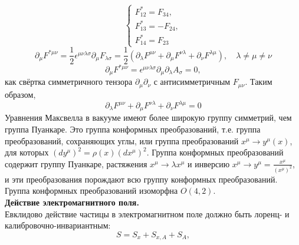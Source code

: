 \documentclass[12pt]{article}
\theoremstyle{definition}
\begin{document}
\begin{equation}
    \begin{cases}
        F^*_{12}=F_{34},\\
        F^*_{13}=-F_{24},\\
        F^*_{14}=F_{23}
    \end{cases}
\end{equation}
\begin{equation}
    \partial_\mu F^{*\mu\nu}=\frac{1}{2}\epsilon^{\mu\nu\lambda\sigma}\partial_\mu F_{\lambda\sigma}=\frac{1}{2}(\partial_\lambda F^{\mu\nu}+\partial_\mu F^{\nu\lambda}+\partial_\nu F^{\lambda\mu}),\quad\lambda\neq\mu\neq\nu
\end{equation}
\begin{equation}
    \partial_\mu F^{*\mu\nu}=\epsilon^{\mu\nu\lambda\sigma}\partial_\mu\partial_\lambda A_\sigma=0,
\end{equation}
как свёртка симметричного тензора $\partial_\mu\partial_\nu$ с антисимметричным $F_{\mu\nu}$. Таким образом,
\begin{equation}
    \partial_\lambda F^{\mu\nu}+\partial_\mu F^{\nu\lambda}+\partial_\nu F^{\lambda\mu}=0
\end{equation}
Уравнения Максвелла в вакууме имеют более широкую группу симметрий, чем группа Пуанкаре. Это группа конформных преобразований, т.е. группа преобразований, сохраняющих углы, или группа преобразований $x^\mu\rightarrow y^\mu(x)$, для которых $(dy^\mu)^2 = \rho(x)(dx^\mu)^2$. Группа конформных преобразований содержит группу Пуанкаре, растяжения $x^\mu\rightarrow\lambda x^\mu$ и инверсию $x^\mu \rightarrow y^\mu =\frac{x^\mu}{(x^\mu)^2}$, и эти преобразования порождают всю группу конформных преобразований. Группа конформных преобразований изоморфна $O(4,2)$.\\
\textbf{Действие электромагнитного поля.}\\
Евклидово действие частицы в электромагнитном поле должно быть лоренц- и калибровочно-инвариантным:
\begin{equation}
    S=S_x+S_{x,A}+S_A,
\end{equation}
\end{document}
